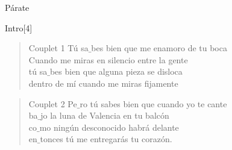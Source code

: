 \begin{song}{Párate}

\begin{instrumental}{Intro}[4]
 \measure{}  
  
\end{instrumental}

\begin{verse}{Couplet 1}
 \hspace{1em} Tú sa$\_$bes bien que me enamoro de tu boca\hspace{10em}\\
 \hspace{1.3em}Cuando me miras en silencio entre la gente\\
 \hspace{1em} tú sa$\_$bes bien que alguna pieza se disloca\\
 \hspace{1em} dentro de mí cuando me miras fijamente
\end{verse}

\begin{verse}{Couplet 2}
 \hspace{1em} Pe$\_$ro tú sabes bien que cuando yo te cante\\
 \hspace{1em} ba$\_$jo la luna de Valencia en tu balcón\\
 \hspace{1em} co$\_$mo ningún desconocido habrá delante\\
 \hspace{1em} en$\_$tonces tú me entregarás tu corazón.
\end{verse}


\end{song}
